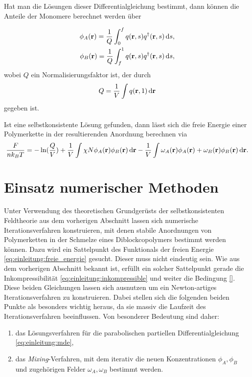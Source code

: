 Hat man die Lösungen dieser Differentialgleichung bestimmt, dann können die Anteile der Monomere berechnet werden über

\begin{equation}
    \begin{aligned}
        \phi_{A}(\mathbf{r}) = \frac{1}{Q} \int_{0}^{f} q(\mathbf{r}, s) q^{\dagger}(\mathbf{r}, s) \mathop{}\!\mathrm{d} s,\\
        \phi_{B}(\mathbf{r}) = \frac{1}{Q} \int_{f}^{1} q(\mathbf{r}, s) q^{\dagger}(\mathbf{r}, s) \mathop{}\!\mathrm{d} s,
    \end{aligned}
\end{equation}
wobei $Q$ ein Normalisierungsfaktor ist, der durch
\begin{equation}
    Q = \frac{1}{V} \int q(\mathbf{r}, 1) \mathop{}\!\mathrm{d} \mathbf{r}
\end{equation}
gegeben ist.

Ist eine selbstkonsistente Lösung gefunden, dann lässt sich die freie Energie einer Polymerkette in der resultierenden Anordnung berechnen via
\begin{equation}
\label{eq:einleitung:freie_energie}
    \frac{F}{n k_{B} T} = - \ln(\frac{Q}{V}) + \frac{1}{V} \int \chi N \phi_{A}(\mathbf{r}) \phi_{B}(\mathbf{r}) \mathop{}\!\mathrm{d} \mathbf{r} - \frac{1}{V} \int \omega_{A}(\mathbf{r}) \phi_{A}(\mathbf{r}) + \omega_{B}(\mathbf{r}) \phi_{B}(\mathbf{r}) \mathop{}\!\mathrm{d} \mathbf{r}.
\end{equation}

\section{Einsatz numerischer Methoden} %
\label{sec:bisherige_numerische_methoden}

Unter Verwendung des theoretischen Grundgerüsts der selbstkonsistenten Feldtheorie aus dem vorherigen Abschnitt lassen sich numerische Iterationsverfahren konstruieren, mit denen stabile Anordnungen von Polymerketten in der Schmelze eines Diblockcopolymers bestimmt werden können.
Dazu wird ein Sattelpunkt des Funktionals der freien Energie \eqref{eq:einleitung:freie_energie} gesucht.
Dieser muss nicht eindeutig sein.
Wie aus dem vorherigen Abschnitt bekannt ist, erfüllt ein solcher Sattelpunkt gerade die Inkompressibilität \eqref{eq:einleitung:inkompressible} und weiter die Bedingung \eqref{}.
Diese beiden Gleichungen lassen sich ausnutzen um ein Newton-artiges Iterationsverfahren zu konstruieren.
Dabei stellen sich die folgenden beiden Punkte als besonders wichtig heraus, da sie massiv die Laufzeit des Iterationsverfahren beeinflussen.
Von besonderer Bedeutung sind daher:
\begin{enumerate}
    \item das Lösungsverfahren für die parabolischen partiellen Differentialgleichung \eqref{eq:einleitung:mde},
    \item das \emph{Mixing}-Verfahren, mit dem iterativ die neuen Konzentrationen $\phi_{A}, \phi_{B}$ und zugehörigen Felder $\omega_{A}, \omega_{B}$ bestimmt werden.
\end{enumerate}

